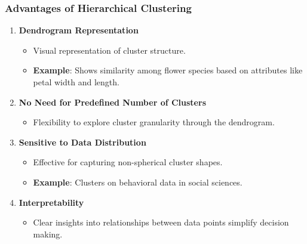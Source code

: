 \documentclass[aspectratio=169]{beamer}
\begin{document}
\begin{frame}[fragile]
    \frametitle{Advantages of Hierarchical Clustering}
    \begin{enumerate}
        \item \textbf{Dendrogram Representation}
        \begin{itemize}
            \item Visual representation of cluster structure.
            \item \textbf{Example}: Shows similarity among flower species based on attributes like petal width and length.
        \end{itemize}

        \item \textbf{No Need for Predefined Number of Clusters}
        \begin{itemize}
            \item Flexibility to explore cluster granularity through the dendrogram.
            \end{itemize}

        \item \textbf{Sensitive to Data Distribution}
        \begin{itemize}
            \item Effective for capturing non-spherical cluster shapes.
            \item \textbf{Example}: Clusters on behavioral data in social sciences.
        \end{itemize}

        \item \textbf{Interpretability}
        \begin{itemize}
            \item Clear insights into relationships between data points simplify decision making.
        \end{itemize}
    \end{enumerate}
\end{frame}
\end{document}
